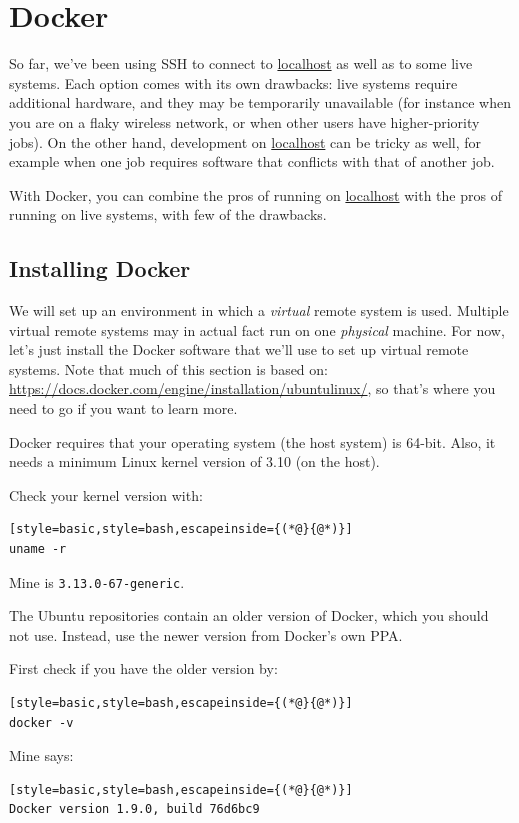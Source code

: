 \documentclass[12pt, a4paper, twoside, openany, titlepage]{book}
\begin{document}
\section{Docker}
\label{sec:docker}




So far, we've been using SSH to connect to \url{localhost} as well as to some live systems. Each option comes with its own drawbacks: live systems require additional hardware, and they may be temporarily unavailable (for instance when you are on a flaky wireless network, or when other users have higher-priority jobs). On the other hand, development on \url{localhost} can be tricky as well, for example when one job requires software that conflicts with that of another job.

With Docker, you can combine the pros of running on \url{localhost} with the pros of running on live systems, with few of the drawbacks.

\subsection{Installing Docker}

We will set up an environment in which a \textit{virtual} remote system is used. Multiple virtual remote systems may in actual fact run on one \textit{physical} machine. For now, let's just install the Docker software that we'll use to set up virtual remote systems. Note that much of this section is based on: \url{https://docs.docker.com/engine/installation/ubuntulinux/}, so that's where you need to go if you want to learn more.

Docker requires that your operating system (the host system) is 64-bit. Also, it needs a minimum Linux kernel version of 3.10 (on the host).

Check your kernel version with:
\begin{lstlisting}[style=basic,style=bash,escapeinside={(*@}{@*)}]
uname -r
\end{lstlisting}
Mine is \texttt{3.13.0-67-generic}.

The Ubuntu repositories contain an older version of Docker, which you should not use. Instead, use the newer version from Docker's own PPA.

First check if you have the older version by:
\begin{lstlisting}[style=basic,style=bash,escapeinside={(*@}{@*)}]
docker -v
\end{lstlisting}
Mine says:
\begin{lstlisting}[style=basic,style=bash,escapeinside={(*@}{@*)}]
Docker version 1.9.0, build 76d6bc9
\end{lstlisting}
\end{document}
